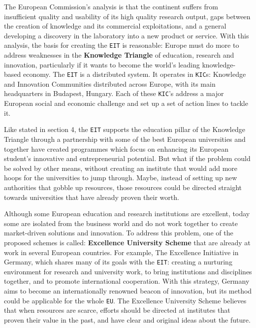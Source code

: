 \documentclass[11pt,a4paper,oneside,twocolumn]{IEEEtran}
\begin{document}
The European Commission's analysis is that the continent suffers from insufficient quality and usability of its high quality research output, gaps between the creation of knowledge and its commercial exploitations, and a general developing a discovery in the laboratory into a new product or service.\cite{6_1} With this analysis, the basis for creating the \texttt{EIT} is reasonable: Europe must do more to address weaknesses in the \textbf{Knowledge Triangle} of education, research and innovation, particularly if it wants to become the world's leading knowledge-based economy\cite{6_1}. The \texttt{EIT} is a distributed system. It operates in \texttt{KIC}s: Knowledge and Innovation Communities distributed across Europe, with its main headquarters in Budapest, Hungary. Each of these \texttt{KIC}'s address a major European social and economic challenge and set up a set of action lines to tackle it.

Like stated in section 4, the \texttt{EIT} supports the education pillar of the Knowledge Triangle through a partnership with some of the best European universities and together have created programmes which focus on enhancing its European student's innovative and entrepreneurial  potential. But what if the problem could be solved by other means, without creating an institute that would add more hoops for the universities to jump through. Maybe, instead of setting up new authorities that gobble up resources, those resources could be directed straight towards universities  that have already proven their worth.

Although some European education and research institutions are excellent, today some are isolated from the business world and do not work together to create market-driven solutions and innovation. To address this problem, one of the proposed schemes is called: \textbf{Excellence University Scheme} that are already at work in several European countries. For example, The Excellence Initiative in Germany, which shares many of its goals with the \texttt{EIT}: creating a nurturing environment for research and university work, to bring institutions and disciplines together, and to promote international cooperation. With this strategy, Germany aims to become an internationally renowned beacon of innovation, but its method could be applicable for the whole \texttt{EU}\cite{6_3}. The Excellence University Scheme believes that when resources are scarce, efforts should be directed at institutes that proven their value in the past, and have clear and original ideas about the future.
\end{document}

